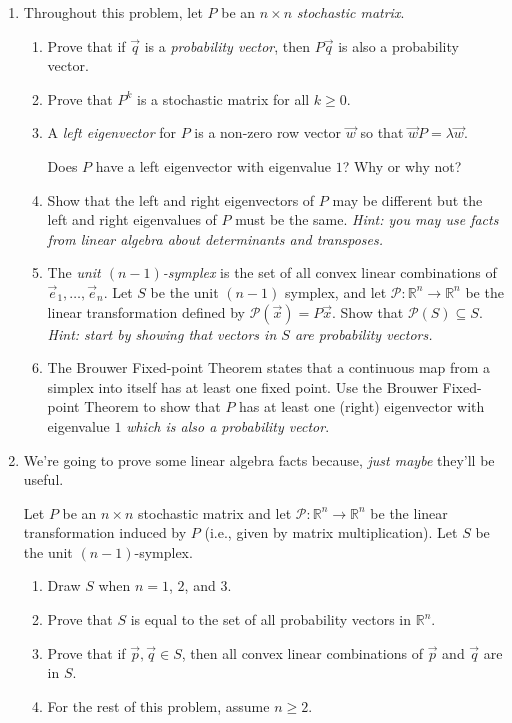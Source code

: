 \documentclass[letter]{article}
\newcommand{\R}{\mathbb{R}}
\begin{document}
\begin{enumerate}
		\item Throughout this problem, let $P$ be an $n\times n$ \emph{stochastic matrix}. 
		\begin{enumerate}
			\item Prove that if $\vec q$ is a \emph{probability vector}, then $P\vec q$ is also
				a probability vector.
			\item Prove that $P^k$ is a stochastic matrix for all $k\geq 0$.

			\item A \emph{left eigenvector} for $P$ is a non-zero row vector $\vec w$ so
				that $\vec wP=\lambda \vec w$.

				Does $P$ have a left eigenvector with eigenvalue $1$? Why or why not?
			\item Show that the left and right eigenvectors of $P$ may be different but the left
				and right eigenvalues of $P$ must be the same. \emph{Hint: you may use
				facts from linear algebra about determinants and transposes.}

			\item The \emph{unit $(n-1)$-symplex} is the set of all convex linear combinations
				of $\vec e_1,\ldots,\vec e_n$. Let $S$ be the unit $(n-1)$ symplex, and let $\mathcal P:\R^n\to\R^n$
				be the linear transformation defined by $\mathcal P(\vec x)=P\vec x$. Show that $\mathcal P(S)\subseteq S$.
				\emph{Hint: start by showing that vectors in $S$ are probability vectors.}

			\item The Brouwer Fixed-point Theorem states that a continuous map from a simplex into itself
				has at least one fixed point. Use the Brouwer Fixed-point Theorem to show that $P$ has
				at least one (right) eigenvector with eigenvalue $1$ \emph{which is also a probability vector}.
		\end{enumerate}

		\item We're going to prove some linear algebra facts because, \emph{just maybe} they'll be useful.
		
			Let $P$ be an $n\times n$ stochastic matrix and let $\mathcal P:\R^n\to\R^n$ be the linear
			transformation induced by $P$ (i.e., given by matrix multiplication). Let $S$ be the unit $(n-1)$-symplex.
		\begin{enumerate}
			\item Draw $S$ when $n=1$, $2$, and $3$.
			\item Prove that $S$ is equal to the set of all probability vectors in $\R^n$.
			\item Prove that if $\vec p,\vec q\in S$, then all convex linear combinations of $\vec p$
				and $\vec q$ are in $S$.
			\item For the rest of this problem, assume $n\geq 2$.


\end{enumerate}
\end{enumerate}
\end{document}
